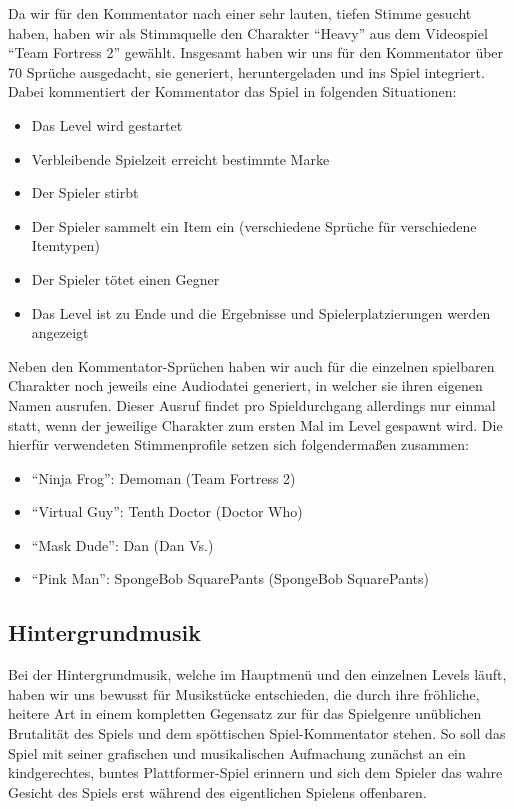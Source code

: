 Da wir für den Kommentator nach einer sehr lauten, tiefen Stimme gesucht haben, haben wir als Stimmquelle den Charakter \enquote{Heavy} aus dem Videospiel \enquote{Team Fortress 2} gewählt.
Insgesamt haben wir uns für den Kommentator über 70 Sprüche ausgedacht, sie generiert, heruntergeladen und ins Spiel integriert.
Dabei kommentiert der Kommentator das Spiel in folgenden Situationen:

\begin{itemize}
 \item Das Level wird gestartet
 \item Verbleibende Spielzeit erreicht bestimmte Marke
 \item Der Spieler stirbt
 \item Der Spieler sammelt ein Item ein (verschiedene Sprüche für verschiedene Itemtypen)
 \item Der Spieler tötet einen Gegner
 \item Das Level ist zu Ende und die Ergebnisse und Spielerplatzierungen werden angezeigt
\end{itemize}

Neben den Kommentator-Sprüchen haben wir auch für die einzelnen spielbaren Charakter noch jeweils eine Audiodatei generiert, in welcher sie ihren eigenen Namen ausrufen.
Dieser Ausruf findet pro Spieldurchgang allerdings nur einmal statt, wenn der jeweilige Charakter zum ersten Mal im Level gespawnt wird. Die hierfür verwendeten Stimmenprofile setzen sich folgendermaßen zusammen:

\begin{itemize}
 \item \enquote{Ninja Frog}: Demoman (Team Fortress 2)
 \item \enquote{Virtual Guy}: Tenth Doctor (Doctor Who)
 \item \enquote{Mask Dude}: Dan (Dan Vs.)
 \item \enquote{Pink Man}: SpongeBob SquarePants (SpongeBob SquarePants)
\end{itemize}

\subsection{Hintergrundmusik}
Bei der Hintergrundmusik, welche im Hauptmenü und den einzelnen Levels läuft, haben wir uns bewusst für Musikstücke entschieden, die durch ihre fröhliche, heitere Art in einem
kompletten Gegensatz zur für das Spielgenre unüblichen Brutalität des Spiels und dem spöttischen Spiel-Kommentator stehen.
So soll das Spiel mit seiner grafischen und musikalischen Aufmachung zunächst an ein kindgerechtes, buntes Plattformer-Spiel erinnern und sich dem Spieler das wahre Gesicht des Spiels erst während des eigentlichen Spielens offenbaren.\\

